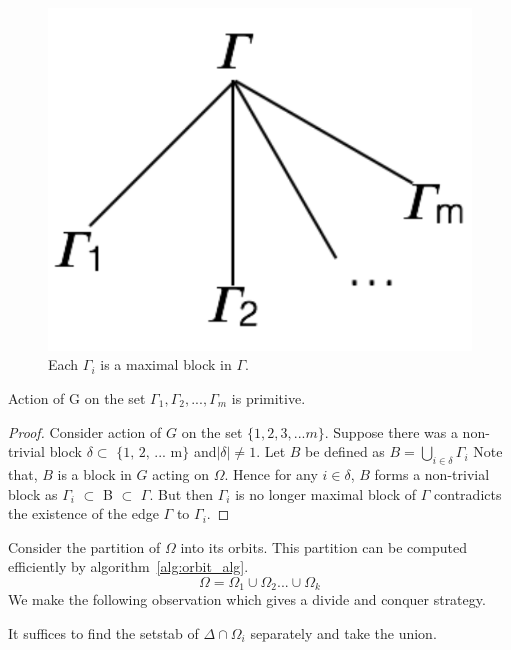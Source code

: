 \begin{figure}[htp!]
	\centering
	\includegraphics[scale=0.5]{images/structuretree.pdf}
	\caption{Each $\Gamma_{i}$ is a maximal block in $\Gamma$.}
	\label{fig:maxblocks}
\end{figure}

\begin{claim}
Action of G on the set ${\Gamma_{1}, \Gamma_{2}, ..., \Gamma_{m}}$ is primitive.
\end{claim}
\begin{proof}
Consider action of $G$ on the set $\{1, 2, 3, ... m\}$. Suppose there was a
non-trivial block $\delta \subset \text{ \{1, 2, ... m\}}$ and$|\delta| \neq 1
$. Let $B$ be defined as $ B = \bigcup_{i \in \delta} \Gamma_{i} $
Note that, $B$ is a block in $G$ acting on $\Omega$. 
Hence for any $i \in \delta$, $B$ forms a non-trivial block as $\Gamma_{i}$ $\subset$ B $\subset$
 $\Gamma$. But then $\Gamma_i$ is no longer maximal block of $\Gamma$  contradicts the existence of the edge $\Gamma$ to  $\Gamma_{i}$.
\end{proof}

Consider the partition of $\Omega$ into its orbits. This partition can be computed efficiently by algorithm~\ref{alg:orbit_alg}. 
$$ \Omega = \Omega_{1} \cup \Omega_{2} ... \cup \Omega_{k} $$
We make the following observation which gives a divide and conquer strategy.
\begin{observation}
It suffices to find the setstab of $\Delta\cap\Omega_{i}$ separately and take the union.
\end{observation}

